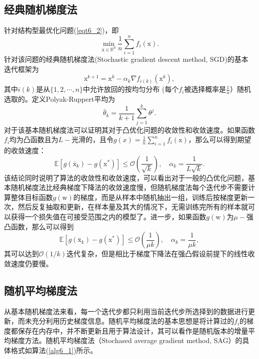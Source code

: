 \subsection{经典随机梯度法}
针对结构型最优化问题(\ref{eqt6_2})，即
\begin{equation}
    \min _{\mathrm{x} \in \mathbb{R}^{d}} \frac{1}{n} \sum_{i=1}^{n} f_{i}(\mathrm{x}) .
    \nonumber
\end{equation}
针对该问题的经典随机梯度法(Stochastic gradient descent method, SGD)\cite{SGD}的基本迭代框架为
\begin{equation}
    \mathrm{x}^{k+1}=\mathrm{x}^{k}-\alpha_{k} \nabla f_{i(k)}\left(\mathrm{x}^{k}\right),
    \label{eqt6_3}
\end{equation}
其中$i(k)$是从$\{1, 2, \cdots, n\}$中允许放回的按均匀分布 (每个$f_{i}$被选择概率是$\frac{1}{n}$）随机选取的。定义Polyak-Ruppert平均\cite{2021Statistical}为
\begin{equation}
    \bar{\theta}_{k}=\frac{1}{k+1} \sum_{j=1}^{k} \theta^{j} .
    \label{eqt6_4}
\end{equation}
对于该基本随机梯度法可以证明其对于凸优化问题的收敛性和收敛速度。如果函数$f_{i}$均为凸函数且为$L-$光滑的，且令$g(x)=\frac{1}{n} \sum_{i=1}^{n} f_{i}(\mathrm{x})$，那么可以得到期望的收敛速度：
\begin{equation}
    \mathbb{E}\left[g\left(\overline{\mathrm{x}}_{k}\right)-g\left(\mathrm{x}^{*}\right)\right] \leq \mathcal{O}\left(\frac{1}{\sqrt{k}}\right), \quad \alpha_{k}=\frac{1}{L \sqrt{k}} .
    \label{eqt6_5}
\end{equation}
该结论同时说明了算法的收敛性和收敛速度\cite{SGD}，可以看出对于一般的凸优化问题，基本随机梯度法比经典梯度下降法的收敛速度慢，但随机梯度法每个迭代步不需要计算整体目标函数$g(\mathrm{w})$的梯度，而是从样本中随机抽出一组，训练后按梯度更新一次，然后反复抽取和更新，在样本量及其大的情况下，无需训练完所有的样本就可以获得一个损失值在可接受范围之内的模型了。进一步，如果函数$g(\mathrm{w})$为$\mu-$强凸函数，那么可以得到
\begin{equation}
    \mathbb{E}\left[g\left(\overline{\mathrm{x}}_{k}\right)-g\left(\mathrm{x}^{*}\right)\right] \leq \mathcal{O}\left(\frac{1}{\mu k}\right), \quad \alpha_{k}=\frac{1}{\mu k} ,
    \label{eqt6_6}
\end{equation}
其可以达到$\mathcal{O}(1 / k)$迭代复杂，但是相比于梯度下降法在强凸假设前提下的线性收敛速度仍要慢。

\subsection{随机平均梯度法}
从基本随机梯度法来看，每一个迭代步都只利用当前迭代步所选择到的数据进行更新，而未充分利用历史梯度信息。随机平均梯度法的基本思想是将计算过的$f_i$的梯度都保存在内存中，并不断更新且用于算法设计，其可以看作是随机版本的增量平均梯度方法。随机平均梯度法（Stochased average gradient method, SAG）\cite{SAG}的具体格式如算法(\ref{alg6_1})所示。

